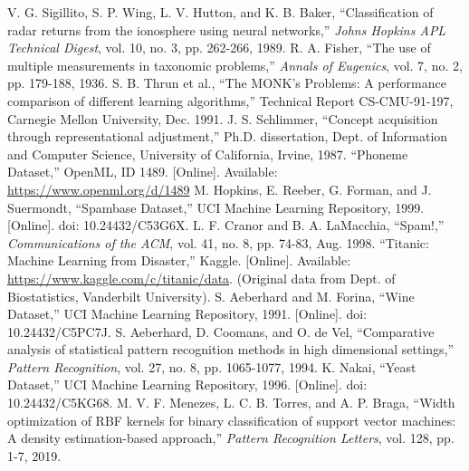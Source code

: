\documentclass[conference]{IEEEtran}
\begin{document}
\begin{thebibliography}{99}
 V. G. Sigillito, S. P. Wing, L. V. Hutton, and K. B. Baker, “Classification of radar returns from the ionosphere using neural networks,” \textit{Johns Hopkins APL Technical Digest}, vol. 10, no. 3, pp. 262-266, 1989.
 R. A. Fisher, “The use of multiple measurements in taxonomic problems,” \textit{Annals of Eugenics}, vol. 7, no. 2, pp. 179-188, 1936.
 S. B. Thrun et al., “The MONK's Problems: A performance comparison of different learning algorithms,” Technical Report CS-CMU-91-197, Carnegie Mellon University, Dec. 1991.
 J. S. Schlimmer, “Concept acquisition through representational adjustment,” Ph.D. dissertation, Dept. of Information and Computer Science, University of California, Irvine, 1987.
 “Phoneme Dataset,” OpenML, ID 1489. [Online]. Available: \url{https://www.openml.org/d/1489}
 M. Hopkins, E. Reeber, G. Forman, and J. Suermondt, “Spambase Dataset,” UCI Machine Learning Repository, 1999. [Online]. doi: 10.24432/C53G6X.
 L. F. Cranor and B. A. LaMacchia, “Spam!,” \textit{Communications of the ACM}, vol. 41, no. 8, pp. 74-83, Aug. 1998.
 “Titanic: Machine Learning from Disaster,” Kaggle. [Online]. Available: \url{https://www.kaggle.com/c/titanic/data}. (Original data from Dept. of Biostatistics, Vanderbilt University).
 S. Aeberhard and M. Forina, “Wine Dataset,” UCI Machine Learning Repository, 1991. [Online]. doi: 10.24432/C5PC7J.
 S. Aeberhard, D. Coomans, and O. de Vel, “Comparative analysis of statistical pattern recognition methods in high dimensional settings,” \textit{Pattern Recognition}, vol. 27, no. 8, pp. 1065-1077, 1994.
 K. Nakai, “Yeast Dataset,” UCI Machine Learning Repository, 1996. [Online]. doi: 10.24432/C5KG68.
 M. V. F. Menezes, L. C. B. Torres, and A. P. Braga, “Width optimization of RBF kernels for binary classification of support vector machines: A density estimation-based approach,” \textit{Pattern Recognition Letters}, vol. 128, pp. 1-7, 2019.
\end{thebibliography}
\end{document}
